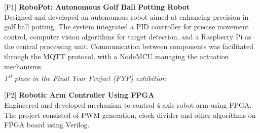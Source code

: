 

\begin{cventries}
\begin{rSection}{}
{\vspace{-0.5em}\hspace{-1.5em}[P1]\hspace{1em}\bodyfont\bfseries\color{darktext} {RoboPot: Autonomous Golf Ball Potting Robot \hspace{1em} \href{https://github.com/MortazaHassani/RoboPutter}{\Large{\faGithub}}}}
\\\hspace{1.2em}Designed and developed an autonomous robot aimed at enhancing
precision in golf ball potting. The system integrated a PID controller for precise movement control, computer vision
algorithms for target detection, and a Raspberry Pi as the central processing unit. Communication between components
was facilitated through the MQTT protocol, with a NodeMCU managing the actuation mechanisms. 
\\  \hspace{0.5em} \emph{1\textsuperscript{st} place in the Final Year Project (FYP) exhibition}
\vspace{-0.2em}
\end{rSection}

\begin{rSection}{}
    {\hspace{-1.5em}[P2]\hspace{1em}}{\bodyfont\bfseries\color{darktext} {Robotic Arm Controller Using FPGA \hspace{1em} \href{} {\Large{}}}}
    \\\hspace{1.2em}Engineered and developed mechanism to control 4 axis robot arm using FPGA. The project consisted of PWM generation, clock divider and other algorithms on FPGA board using Verilog.
    \vspace{-0.2em}
    \end{rSection}


\end{cventries}
